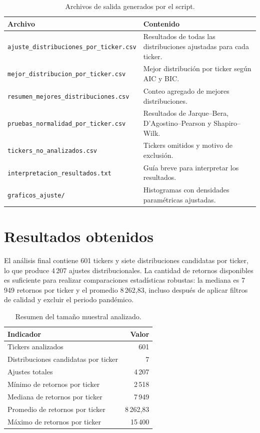 \begin{table}[h]
\centering
\caption{Archivos de salida generados por el script.}
\label{tab:anexo4_salidas}
\scriptsize
\begin{tabular}{@{}p{}p{}@{}}
\toprule
Archivo & Contenido \\
\midrule
\texttt{ajuste\_distribuciones\_por\_ticker.csv} & Resultados de todas las distribuciones ajustadas para cada ticker. \\
\texttt{mejor\_distribucion\_por\_ticker.csv} & Mejor distribuci\'on por ticker seg\'un AIC y BIC. \\
\texttt{resumen\_mejores\_distribuciones.csv} & Conteo agregado de mejores distribuciones. \\
\texttt{pruebas\_normalidad\_por\_ticker.csv} & Resultados de Jarque--Bera, D'Agostino--Pearson y Shapiro--Wilk. \\
\texttt{tickers\_no\_analizados.csv} & Tickers omitidos y motivo de exclusi\'on. \\
\texttt{interpretacion\_resultados.txt} & Gu\'ia breve para interpretar los resultados. \\
\texttt{graficos\_ajuste/} & Histogramas con densidades param\'etricas ajustadas. \\
\bottomrule
\end{tabular}
\end{table}

\section*{Resultados obtenidos}

El an\'alisis final contiene 601 tickers y siete distribuciones candidatas por ticker, lo que produce 4\,207 ajustes distribucionales. La cantidad de retornos disponibles es suficiente para realizar comparaciones estad\'isticas robustas: la mediana es 7\,949 retornos por ticker y el promedio 8\,262,83, incluso despu\'es de aplicar filtros de calidad y excluir el periodo pand\'emico.

\begin{table}[h]
\centering
\caption{Resumen del tama\~no muestral analizado.}
\label{tab:anexo4_tamano}
\small
\begin{tabular}{@{}lr@{}}
\toprule
Indicador & Valor \\
\midrule
Tickers analizados & 601 \\
Distribuciones candidatas por ticker & 7 \\
Ajustes totales & 4\,207 \\
M\'inimo de retornos por ticker & 2\,518 \\
Mediana de retornos por ticker & 7\,949 \\
Promedio de retornos por ticker & 8\,262,83 \\
M\'aximo de retornos por ticker & 15\,400 \\
\bottomrule
\end{tabular}
\end{table}

